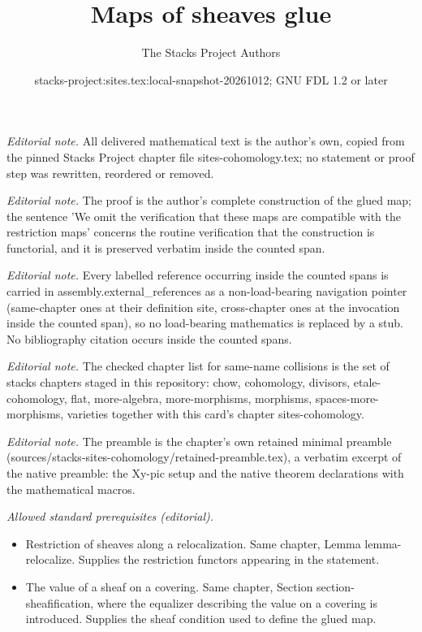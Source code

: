 \documentclass[10pt,a4paper]{amsart}
\title{Maps of sheaves glue}
\author{The Stacks Project Authors}
\date{stacks-project:sites.tex:local-snapshot-20261012; GNU FDL 1.2 or later}
\theoremstyle{plain}
\theoremstyle{definition}
\theoremstyle{remark}
\numberwithin{equation}{subsection}
\begin{document}
\maketitle
\noindent\textit{Editorial note.} All delivered mathematical text is the author's own, copied from the pinned Stacks Project chapter file sites-cohomology.tex; no statement or proof step was rewritten, reordered or removed.\par\medskip
\noindent\textit{Editorial note.} The proof is the author's complete construction of the glued map; the sentence 'We omit the verification that these maps are compatible with the restriction maps' concerns the routine verification that the construction is functorial, and it is preserved verbatim inside the counted span.\par\medskip
\noindent\textit{Editorial note.} Every labelled reference occurring inside the counted spans is carried in assembly.external\_references as a non-load-bearing navigation pointer (same-chapter ones at their definition site, cross-chapter ones at the invocation inside the counted span), so no load-bearing mathematics is replaced by a stub. No bibliography citation occurs inside the counted spans.\par\medskip
\noindent\textit{Editorial note.} The checked chapter list for same-name collisions is the set of stacks chapters staged in this repository: chow, cohomology, divisors, etale-cohomology, flat, more-algebra, more-morphisms, morphisms, spaces-more-morphisms, varieties together with this card's chapter sites-cohomology.\par\medskip
\noindent\textit{Editorial note.} The preamble is the chapter's own retained minimal preamble (sources/stacks-sites-cohomology/retained-preamble.tex), a verbatim excerpt of the native preamble: the Xy-pic setup and the native theorem declarations with the mathematical macros.\par\medskip
\noindent\textit{Allowed standard prerequisites (editorial).}\begin{itemize}
\item Restriction of sheaves along a relocalization. Same chapter, Lemma lemma-relocalize. Supplies the restriction functors appearing in the statement.
\item The value of a sheaf on a covering. Same chapter, Section section-sheafification, where the equalizer describing the value on a covering is introduced. Supplies the sheaf condition used to define the glued map.
\end{itemize}\medskip
\end{document}

